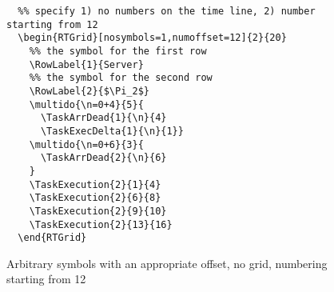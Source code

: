 \documentclass{article}
\begin{document}
\begin{figure}[h]
  \centering
  \begin{RTGrid}[nosymbols=1,numoffset=12]{2}{20}
  \end{RTGrid}
\begin{verbatim}
  %% specify 1) no numbers on the time line, 2) number starting from 12
  \begin{RTGrid}[nosymbols=1,numoffset=12]{2}{20}
    %% the symbol for the first row
    \RowLabel{1}{Server}
    %% the symbol for the second row
    \RowLabel{2}{$\Pi_2$}
    \multido{\n=0+4}{5}{         
      \TaskArrDead{1}{\n}{4}    
      \TaskExecDelta{1}{\n}{1}}
    \multido{\n=0+6}{3}{         
      \TaskArrDead{2}{\n}{6}
    }
    \TaskExecution{2}{1}{4}
    \TaskExecution{2}{6}{8}
    \TaskExecution{2}{9}{10}
    \TaskExecution{2}{13}{16}        
  \end{RTGrid}
\end{verbatim}
  \caption{Arbitrary symbols with an appropriate offset, no grid, numbering starting from 12}
  \label{fig:ex2b}
\end{figure}


    

    
\end{document}
